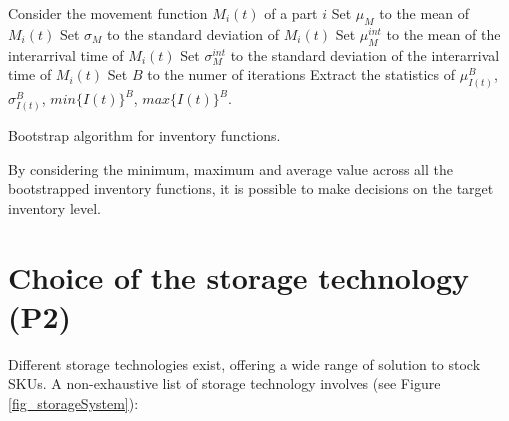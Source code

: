 \begin{algorithm}[H]
\DontPrintSemicolon
\SetAlgoLined
Consider the movement function $M_i(t)$ of a part $i$\;
Set $\mu_M$ to the mean of $M_i(t)$\;
Set $\sigma_M$ to the standard deviation of $M_i(t)$\;
Set $\mu_M^{int}$ to the mean of the interarrival time of $M_i(t)$\;
Set $\sigma_M^{int}$ to the standard deviation of the interarrival time of $M_i(t)$\;
Set $B$ to the numer of iterations \;
Extract the statistics of $\mu_{I(t)}^{B}$, $\sigma_{I(t)}^{B}$, $min\{I(t)\}^{B}$, $max\{I(t)\}^{B}$.
    
\caption{Bootstrap algorithm for inventory functions.}
\label{algo_inventory_bootstrap}
\end{algorithm}

By considering the minimum, maximum and average value across all the bootstrapped inventory functions, it is possible to make decisions on the target inventory level.

\section{Choice of the storage technology (P2)} \label{secWhTech}

Different storage technologies exist, offering a wide range of solution to stock SKUs. A non-exhaustive list of storage technology involves (see Figure \ref{fig_storageSystem}):

